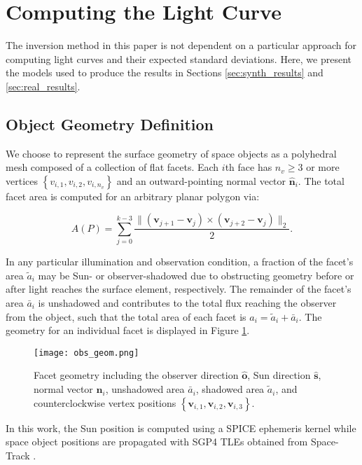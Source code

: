 \documentclass[a4paper,twocolumn]{spaceDebrisC} %
\newcommand{\vctr}[1]{\bm{#1}}
\newcommand{\unitv}[1]{\hat{\vctr{#1}}}
\newcommand{\figmed}[0]{0.4\textwidth}
\begin{document}
\section{Computing the Light Curve}

The inversion method in this paper is not dependent on a particular approach for computing light curves and their expected standard deviations. Here, we present the models used to produce the results in Sections \ref{sec:synth_results} and \ref{sec:real_results}.

\subsection{Object Geometry Definition}

We choose to represent the surface geometry of space objects as a polyhedral mesh composed of a collection of flat facets. Each $i$th face has $n_v \geq 3$ or more vertices $\left\{ v_{i,1}, v_{i,2}, v_{i,n_v} \right\}$ and an outward-pointing normal vector $\unitv{n}_i$. The total facet area is computed for an arbitrary planar polygon via:

\begin{equation} \label{eq:poly_area}
 A(P) = \sum_{j=0}^{k-3} \frac{\| \left( \vctr{v}_{j+1} - \vctr{v}_{j} \right) \times \left( \vctr{v}_{j+2} - \vctr{v}_{j} \right)\|_2}{2}.
 \end{equation} 
 
 In any particular illumination and observation condition, a fraction of the facet's area $\tilde{a}_i$ may be Sun- or observer-shadowed due to obstructing geometry before or after light reaches the surface element, respectively. The remainder of the facet's area $\bar{a}_i$ is unshadowed and contributes to the total flux reaching the observer from the object, such that the total area of each facet is $a_i = \tilde{a}_i + \bar{a}_i$. The geometry for an individual facet is displayed in Figure \ref{fig:facet_geom}.

\begin{figure}[H]
  \centering
  \texttt{[image: obs\_geom.png]}
  \caption{Facet geometry including the observer direction $\unitv{o}$, Sun direction $\unitv{s}$, normal vector $\unitv{n}_i$, unshadowed area $\bar{a}_i$, shadowed area $\tilde{a}_i$, and counterclockwise vertex positions $\left\{ \vctr{v}_{i,1}, \vctr{v}_{i,2}, \vctr{v}_{i,3} \right\}$.}
  \label{fig:facet_geom}
\end{figure}

In this work, the Sun position is computed using a SPICE ephemeris kernel \cite{spice} while space object positions are propagated with SGP4 TLEs obtained from Space-Track \cite{spacetrack}.
\end{document}
